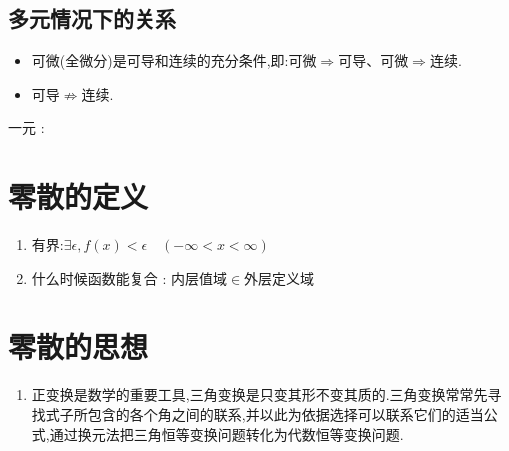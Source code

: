 {{{        \begin{center}
        \end{center}
    }%

    \subsection{多元情况下的关系}{
        \begin{itemize}
            \item 可微(全微分)是可导和连续的充分条件,即:可微$\Rightarrow$可导、可微$\Rightarrow$连续.
            \item 可导$\nRightarrow$连续.
        \end{itemize}

        \begin{center}
            一元 :
        \end{center}
    }%

}%

\section{零散的定义}{
    \begin{enumerate}
        \item 有界:$\exists\epsilon,f(x) < \epsilon\quad(-\infty < x < \infty )$
        \item 什么时候函数能复合 : 内层值域$\in$外层定义域
    \end{enumerate}
}%

\section{零散的思想}{
    \begin{enumerate}
        \item 正变换是数学的重要工具,三角变换是只变其形不变其质的.三角变换常常先寻找式子所包含的各个角之间的联系,并以此为依据选择可以联系它们的适当公式,通过换元法把三角恒等变换问题转化为代数恒等变换问题.
    \end{enumerate}
}%

}%